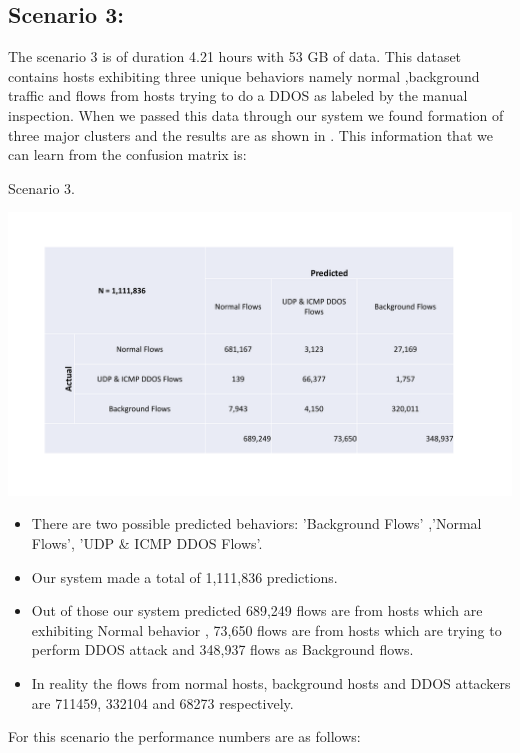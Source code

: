 \subsection{Scenario 3:}
The scenario 3 is of duration 4.21 hours with 53 GB of data. This dataset contains hosts exhibiting three unique behaviors namely normal ,background traffic and flows from hosts trying to do a DDOS as labeled by the manual inspection. When we passed this data through our system we found formation of three major clusters and the results are as shown in  . This information that we can learn from the confusion matrix is:

\begin{table}[b]
	\caption{Scenario 3.}%
	\centerline{\includegraphics[scale = 0.55]{scenario3.pdf}}	
\end{table}

\begin{itemize}
	\item There are two possible predicted behaviors: 'Background Flows' ,'Normal Flows', 'UDP \& ICMP DDOS Flows'. 
	\item Our system made a total of 1,111,836 predictions.
	\item Out of those our system predicted 689,249 flows are from hosts which are exhibiting Normal behavior , 73,650 flows are from hosts which are trying to perform DDOS attack and 348,937 flows as Background flows.
	\item In reality the flows from normal hosts, background hosts and DDOS attackers are  711459, 332104 and 68273 respectively.
\end{itemize}

For this scenario the performance numbers are as follows:

